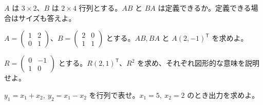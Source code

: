 \documentclass[11pt]{article}
\begin{document}

\problem[サイズの判定]
$A$ は $3\times2$、$B$ は $2\times4$ 行列とする。$AB$ と $BA$ は定義できるか。定義できる場合はサイズも答えよ。
\workspace{38mm}

\problem[積と非可換性]
$A=\begin{pmatrix}1&2\\0&1\end{pmatrix}$、$B=\begin{pmatrix}2&0\\1&1\end{pmatrix}$ とする。$AB,BA$ と $A(2,-1)^{\mathsf T}$ を求めよ。
\workspace{38mm}
\newpage

\problem[回転]
$R=\begin{pmatrix}0&-1\\1&0\end{pmatrix}$ とする。$R(2,1)^{\mathsf T}$、$R^2$ を求め、それぞれ図形的な意味を説明せよ。
\workspace{38mm}

\problem[センサの出力]
$y_1=x_1+x_2,\ y_2=x_1-x_2$ を行列で表せ。$x_1=5,\ x_2=2$ のとき出力を求めよ。
\workspace{38mm}
\end{document}
